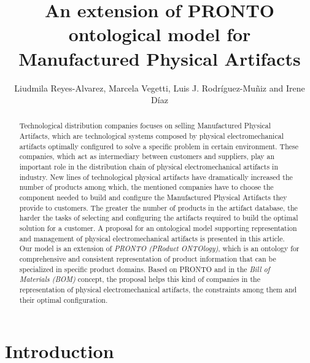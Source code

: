 \documentclass[runningheads,a4paper]{llncs}
\begin{document}
%
\title{An extension of PRONTO ontological model for Manufactured Physical Artifacts}

\author{Liudmila Reyes-Alvarez, Marcela Vegetti, Luis J. Rodr{\'i}guez-Mu{\~n}iz and Irene D{\'i}az}


\maketitle
%
\begin{abstract}
 Technological distribution companies focuses on selling Manufactured Physical Artifacts, which are technological systems composed by physical electromechanical artifacts optimally configured to solve a specific problem in certain environment. These companies, which act as intermediary between customers and suppliers, play an important role in the distribution chain of physical electromechanical artifacts in industry. New lines of technological physical artifacts have dramatically increased the number of products among which, the mentioned companies have to choose the component needed to build and configure the Manufactured Physical Artifacts they provide to customers. The greater the number of products in the artifact database, the harder the tasks of selecting and configuring the artifacts required to build the optimal solution for a customer. A proposal for an ontological model supporting representation and management of physical electromechanical artifacts is presented in this article. Our model is an extension of \textit{PRONTO (PRoduct ONTOlogy)}, which is an ontology for comprehensive and consistent representation of product information that can be specialized in specific product domains. Based on PRONTO and in the \textit{Bill of Materials (BOM)} concept, the proposal helps this kind of companies in the representation of physical electromechanical artifacts, the constraints among them and their optimal configuration.
\end{abstract}
%
\section{Introduction} 
\end{document}
